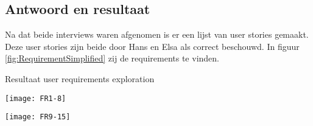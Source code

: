 \subsection{Antwoord en resultaat}
Na dat beide interviews waren afgenomen is er een lijst van user stories gemaakt.
Deze user stories zijn beide door Hans en Elsa als correct beschouwd.
In figuur \ref{fig:RequirementSimplified} zij de requirements te vinden.

%
\begin{graphic}
    \captionsetup{type=figure}
    \caption{Resultaat user requirements exploration}
    \texttt{[image: FR1-8]}

    \whitespace
    \texttt{[image: FR9-15]}
    \label{fig:RequirementSimplified}
\end{graphic}
